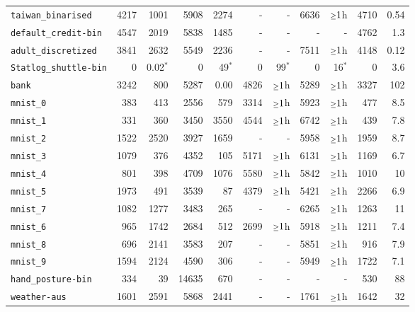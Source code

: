 \begin{tabular}{lrrrrrrrrrr}
\texttt{taiwan\_binarised} & 4217 & 1001 & 5908 & 2274 & - & - & 6636 & $\mathsmaller{\geq}1$h & 4710 & 0.54\\
\texttt{default\_credit-bin} & 4547 & 2019 & 5838 & 1485 & - & - & - & - & 4762 & 1.3\\
\texttt{adult\_discretized} & 3841 & 2632 & 5549 & 2236 & - & - & 7511 & $\mathsmaller{\geq}1$h & 4148 & 0.12\\
\texttt{Statlog\_shuttle-bin} & 0 & 0.02$^*$ & 0 & 49$^*$ & 0 & 99$^*$ & 0 & 16$^*$ & 0 & 3.6\\
\texttt{bank} & 3242 & 800 & 5287 & 0.00 & 4826 & $\mathsmaller{\geq}1$h & 5289 & $\mathsmaller{\geq}1$h & 3327 & 102\\
\texttt{mnist\_0} & 383 & 413 & 2556 & 579 & 3314 & $\mathsmaller{\geq}1$h & 5923 & $\mathsmaller{\geq}1$h & 477 & 8.5\\
\texttt{mnist\_1} & 331 & 360 & 3450 & 3550 & 4544 & $\mathsmaller{\geq}1$h & 6742 & $\mathsmaller{\geq}1$h & 439 & 7.8\\
\texttt{mnist\_2} & 1522 & 2520 & 3927 & 1659 & - & - & 5958 & $\mathsmaller{\geq}1$h & 1959 & 8.7\\
\texttt{mnist\_3} & 1079 & 376 & 4352 & 105 & 5171 & $\mathsmaller{\geq}1$h & 6131 & $\mathsmaller{\geq}1$h & 1169 & 6.7\\
\texttt{mnist\_4} & 801 & 398 & 4709 & 1076 & 5580 & $\mathsmaller{\geq}1$h & 5842 & $\mathsmaller{\geq}1$h & 1010 & 10\\
\texttt{mnist\_5} & 1973 & 491 & 3539 & 87 & 4379 & $\mathsmaller{\geq}1$h & 5421 & $\mathsmaller{\geq}1$h & 2266 & 6.9\\
\texttt{mnist\_7} & 1082 & 1277 & 3483 & 265 & - & - & 6265 & $\mathsmaller{\geq}1$h & 1263 & 11\\
\texttt{mnist\_6} & 965 & 1742 & 2684 & 512 & 2699 & $\mathsmaller{\geq}1$h & 5918 & $\mathsmaller{\geq}1$h & 1211 & 7.4\\
\texttt{mnist\_8} & 696 & 2141 & 3583 & 207 & - & - & 5851 & $\mathsmaller{\geq}1$h & 916 & 7.9\\
\texttt{mnist\_9} & 1594 & 2124 & 4590 & 306 & - & - & 5949 & $\mathsmaller{\geq}1$h & 1722 & 7.1\\
\texttt{hand\_posture-bin} & 334 & 39 & 14635 & 670 & - & - & - & - & 530 & 88\\
\texttt{weather-aus} & 1601 & 2591 & 5868 & 2441 & - & - & 1761 & $\mathsmaller{\geq}1$h & 1642 & 32\\
\bottomrule
\end{tabular}
